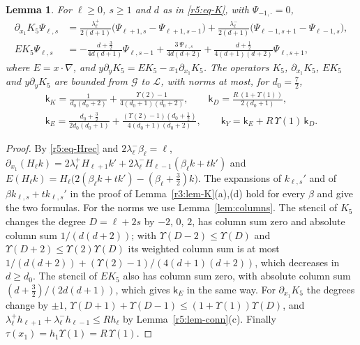\documentclass[11pt]{amsart}
\newtheorem{lemma}[theorem]{Lemma}
\theoremstyle{definition}
\theoremstyle{remark}
\numberwithin{equation}{section}
\newcommand{\Gc}{\mathcal{G}}
\begin{document}
\begin{lemma}\label{r5:lem-K}
For $\ell\geq0$, $s\geq1$ and $d$ as in \eqref{r5:eq-K}, with $\Psi_{-1,\cdot}=0$,
\begin{align*}
\partial_{x_1}K_5\Psi_{\ell,s}&=\frac{\lambda^+_\ell}{2(d+1)}\big(\Psi_{\ell+1,s}-\Psi_{\ell+1,s-1}\big)+\frac{\lambda^-_\ell}{2(d+1)}\big(\Psi_{\ell-1,s+1}-\Psi_{\ell-1,s}\big),\\
EK_5\Psi_{\ell,s}&=-\frac{d+\frac32}{4d(d+1)}\Psi_{\ell,s-1}+\frac{3\,\Psi_{\ell,s}}{4d(d+2)}+\frac{d+\frac12}{4(d+1)(d+2)}\Psi_{\ell,s+1},
\end{align*}
where $E=x\cdot\nabla$, and $y\partial_yK_5=EK_5-x_1\partial_{x_1}K_5$. The operators $K_5$, $\partial_{x_1}K_5$, $EK_5$ and $y\partial_yK_5$ are bounded from $\Gc$ to $\mathcal L$, with norms at most, for $d_0=\frac72$,
\begin{gather*}
\mathsf k_K=\frac1{d_0(d_0+2)}+\frac{\Upsilon(2)-1}{4(d_0+1)(d_0+2)},\qquad\mathsf k_D=\frac{R\,(1+\Upsilon(1))}{2(d_0+1)},\\
\mathsf k_E=\frac{d_0+\frac32}{2d_0(d_0+1)}+\frac{(\Upsilon(2)-1)(d_0+\frac12)}{4(d_0+1)(d_0+2)},\qquad\mathsf k_Y=\mathsf k_E+R\,\Upsilon(1)\,\mathsf k_D .
\end{gather*}
\end{lemma}

\begin{proof}
By \eqref{r5:eq-Hrec} and $2\lambda^-_\ell\beta_\ell=\ell$, $\partial_{x_1}(H_\ell k)=2\lambda^+_\ell H_{\ell+1}k'+2\lambda^-_\ell H_{\ell-1}(\beta_\ell k+tk')$ and $E(H_\ell k)=H_\ell\big(2(\beta_\ell k+tk')-(\beta_\ell+\frac32)k\big)$. The expansions of $k_{\ell,s}'$ and of $\beta k_{\ell,s}+tk_{\ell,s}'$ in the proof of Lemma~\ref{r3:lem-K}(a),(d) hold for every $\beta$ and give the two formulas. For the norms we use Lemma~\ref{lem:columns}. The stencil of $K_5$ changes the degree $D=\ell+2s$ by $-2$, $0$, $2$, has column sum zero and absolute column sum $1/(d(d+2))$; with $\Upsilon(D-2)\leq\Upsilon(D)$ and $\Upsilon(D+2)\leq\Upsilon(2)\Upsilon(D)$ its weighted column sum is at most $1/(d(d+2))+(\Upsilon(2)-1)/(4(d+1)(d+2))$, which decreases in $d\geq d_0$. The stencil of $EK_5$ also has column sum zero, with absolute column sum $(d+\frac32)/(2d(d+1))$, which gives $\mathsf k_E$ in the same way. For $\partial_{x_1}K_5$ the degrees change by $\pm1$, $\Upsilon(D+1)+\Upsilon(D-1)\leq(1+\Upsilon(1))\Upsilon(D)$, and $\lambda^+_\ell h_{\ell+1}+\lambda^-_\ell h_{\ell-1}\leq Rh_\ell$ by Lemma~\ref{r5:lem-conn}(c). Finally $\tau(x_1)=h_1\Upsilon(1)=R\,\Upsilon(1)$.
\end{proof}
\end{document}
